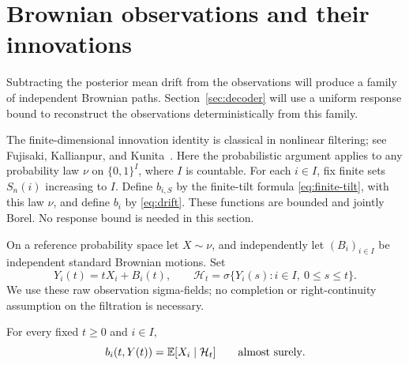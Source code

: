 \section{Brownian observations and their innovations}
\label{sec:observation}

Subtracting the posterior mean drift from the observations will produce
a family of independent Brownian paths. Section~\ref{sec:decoder} will
use a uniform response bound to reconstruct the observations
deterministically from this family.

The finite-dimensional innovation identity is classical in nonlinear
filtering; see Fujisaki, Kallianpur, and
Kunita~\cite[Lemma~2.2]{FujisakiKallianpurKunita1972}.
Here the probabilistic argument applies to any probability law
$\nu$ on $\{0,1\}^I$, where $I$ is countable. For each $i\in I$, fix finite
sets $S_n(i)$ increasing to $I$. Define $b_{i,S}$ by the finite-tilt formula
\eqref{eq:finite-tilt}, with this law $\nu$, and define $b_i$ by
\eqref{eq:drift}. These functions are bounded and jointly Borel. No response
bound is needed in this section.

On a reference probability space let $X\sim\nu$, and independently let
$(B_i)_{i\in I}$ be independent standard Brownian motions. Set
\begin{equation}\label{eq:observation}
 Y_i(t)=tX_i+B_i(t),\qquad
 \mathcal H_t=\sigma\{Y_i(s):i\in I,\ 0\le s\le t\}.
\end{equation}
We use these raw observation sigma-fields; no completion or right-continuity
assumption on the filtration is necessary.

\begin{lemma}\label{lem:posterior}
For every fixed $t\ge0$ and $i\in I$,
\begin{equation}\label{eq:posterior}
 b_i(t,Y(t))=\mathbb E[X_i\mid\mathcal H_t]\qquad\text{almost surely}.
\end{equation}
\end{lemma}

